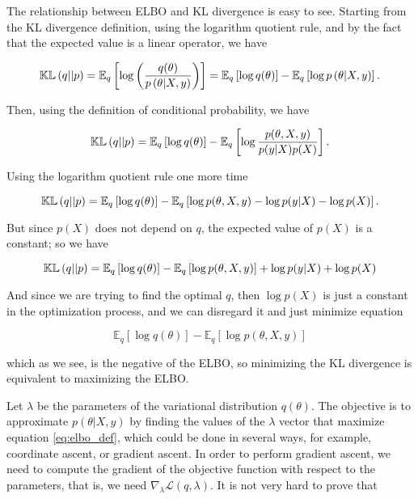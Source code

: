 The relationship between ELBO and KL divergence is easy to see. Starting from the KL divergence definition, using the logarithm quotient rule, and by the fact that the expected value is a linear operator, we have

$$
    \mathbb{KL}\left( q || p \right) =
    \mathbb{E}_q \left[ \log \left( \frac{q(\theta)}{p\left( \theta | X, y \right)} \right) \right] =
    \mathbb{E}_q \left[ \log  q(\theta) \right] - \mathbb{E}_q \left[ \log {p\left( \theta | X, y \right)}  \right].
$$

Then, using the definition of conditional probability, we have

$$
    \mathbb{KL}\left( q || p \right) =
    \mathbb{E}_q \left[ \log  q(\theta) \right] - \mathbb{E}_q \left[ \log \frac{p(\theta, X, y)}{p(y | X) p(X)}  \right].
$$

Using the logarithm quotient rule one more time

$$
  \mathbb{KL}\left( q || p \right) =
  \mathbb{E}_q \left[ \log  q(\theta) \right] - \mathbb{E}_q \left[ \log p(\theta, X, y) - \log p(y | X) - \log p(X)  \right].
$$

But since $p(X)$ does not depend on $q$, the expected value of $p(X)$ is a constant; so we have

$$
 \mathbb{KL}\left( q || p \right) =
 \mathbb{E}_q \left[ \log  q(\theta) \right] - \mathbb{E}_q \left[ \log p(\theta, X, y) \right] + \log p(y | X) + \log p(X)
$$

And since we are trying to find the optimal $q$, then $\log p(X)$ is just a constant in the optimization process, and we can disregard it and just minimize equation

$$
  \mathbb{E}_q \left[ \log  q(\theta) \right] - \mathbb{E}_q \left[ \log p(\theta, X, y) \right]
$$

which as we see, is the negative of the ELBO, so minimizing the KL divergence is equivalent to maximizing the ELBO.

Let $\lambda$ be the parameters of the variational distribution $q(\theta)$. The objective is to approximate $p(\theta | X, y)$ by finding the values of the $\lambda$ vector that maximize equation \ref{eq:elbo_def}, which could be done in several ways, for example, coordinate ascent, or gradient ascent. In order to perform gradient ascent, we need to compute the gradient of the objective function with respect to the parameters, that is, we need $\nabla_{\lambda} \mathcal{L}(q, \lambda)$. It is not very hard to prove that

